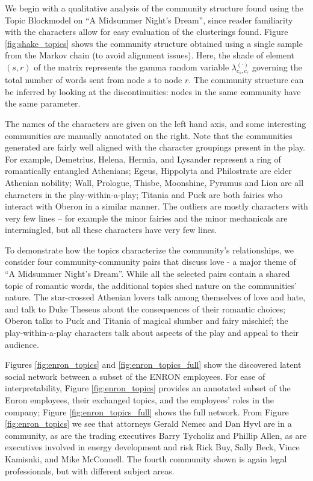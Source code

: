         We begin with a qualitative analysis of the community structure found using the Topic Blockmodel on ``A Midsummer Night's Dream'', since reader familiarity with the characters allow for easy evaluation of the clusterings found. Figure \ref{fig:shake_topics} shows the community structure obtained using a single sample from the Markov chain (to avoid alignment issues). Here, the shade of  element $(s,r)$ of the matrix represents the gamma random variable $\lambda_{c_s,c_r}^{(\cdot)}$ governing the total number of words sent from node $s$ to node $r$. The community structure can be inferred by looking at the discontinuities: nodes in the same community have the same parameter.
    
        The names of the characters are given on the left hand axis, and some interesting communities are manually annotated on the right. Note that the communities generated are fairly well aligned with the character groupings present in the play.  For example, Demetrius, Helena, Hermia, and Lysander represent a ring of romantically entangled Athenians;  Egeus, Hippolyta and Philostrate are elder Athenian nobility; Wall, Prologue, Thisbe, Moonshine, Pyramus and Lion are all characters in the play-within-a-play; Titania and Puck are both fairies who interact with Oberon in a similar manner. The outliers are mostly characters with very few lines -- for example the minor fairies and the minor mechanicals are intermingled, but all these characters have very few lines.
        
        To demonstrate how the topics characterize the community's relationships, we consider four community-community pairs that discuss love - a major theme of ``A Midsummer Night's Dream''. While all the selected pairs contain a shared topic of romantic words, the additional topics shed nature on the communities' nature. The star-crossed Athenian lovers talk among themselves of love and hate, and talk to Duke Theseus about the consequences of their romantic choices; Oberon talks to Puck and Titania of  magical slumber and fairy mischief; the play-within-a-play characters talk about aspects of the play and appeal to their audience.
        
        Figures \ref{fig:enron_topics} and \ref{fig:enron_topics_full} show the discovered latent social network between a subset of the ENRON employees.  For ease of interpretability, Figure \ref{fig:enron_topics} provides an annotated subset of the Enron employees, their exchanged topics, and the employees' roles in the company; Figure \ref{fig:enron_topics_full} shows the full network. From Figure \ref{fig:enron_topics} we see that attorneys Gerald Nemec and Dan Hyvl are in a community, as are the trading executives Barry Tycholiz and Phillip Allen, as are executives involved in energy development and risk Rick Buy, Sally Beck, Vince Kamisnki, and Mike McConnell.  The fourth community shown is again legal professionals, but with different subject areas.
        

